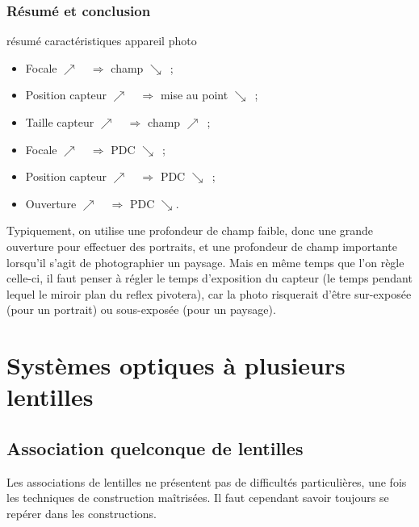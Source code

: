 \documentclass[../main/main.tex]{subfiles}
\begin{document}
\subsubsection{Résumé et conclusion}
\begin{impo}[label=impo:app_phot]{résumé caractéristiques appareil photo}
    \begin{minipage}{0.50\linewidth}
        \begin{itemize}
            \item Focale $\nearrow\quad\Rightarrow$ champ $\searrow$~;
            \item Position capteur $\nearrow\quad\Rightarrow$ mise au point
                $\searrow$~;
            \item Taille capteur $\nearrow\quad\Rightarrow$ champ $\nearrow$~;
        \end{itemize}
    \end{minipage}
    \begin{minipage}{0.50\linewidth}
        \begin{itemize}
            \item Focale $\nearrow\quad\Rightarrow$ PDC $\searrow$~;
            \item Position capteur $\nearrow\quad\Rightarrow$ PDC $\searrow$~;
            \item Ouverture $\nearrow\quad\Rightarrow$ PDC $\searrow$.
        \end{itemize}
    \end{minipage}
\end{impo}

Typiquement, on utilise une profondeur de champ faible, donc une grande
ouverture pour effectuer des portraits, et une profondeur de champ importante
lorsqu'il s'agit de photographier un paysage.\newline
Mais en même temps que l'on règle celle-ci, il faut penser à régler le temps
d'exposition du capteur (le temps pendant lequel le miroir plan du reflex
pivotera), car la photo risquerait d'être sur-exposée (pour un portrait) ou
sous-exposée (pour un paysage).

\section{Systèmes optiques à plusieurs lentilles}

\subsection{Association quelconque de lentilles}
Les associations de lentilles ne présentent pas de difficultés particulières,
une fois les techniques de construction maîtrisées. Il faut cependant savoir
toujours se repérer dans les constructions.
\end{document}
